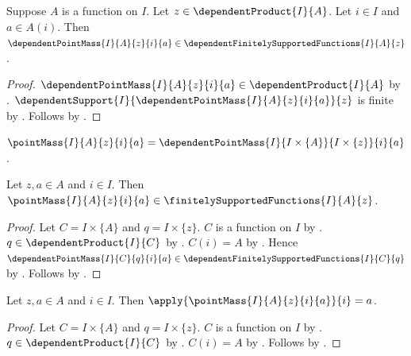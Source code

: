 \begin{proposition}\label{dependent_point_mass_finitely_supported}
    Suppose $A$ is a function on $I$.
    Let $z\in\dependentProduct{I}{A}$.
    Let $i\in I$ and $a\in A(i)$.
    Then
        $\dependentPointMass{I}{A}{z}{i}{a}
            \in\dependentFinitelySupportedFunctions{I}{A}{z}$.
\end{proposition}
\begin{proof}
    $\dependentPointMass{I}{A}{z}{i}{a}
        \in\dependentProduct{I}{A}$ by
        .
    $\dependentSupport{I}{
        \dependentPointMass{I}{A}{z}{i}{a}}{z}$ is finite by
        .
    Follows by
        .
\end{proof}

\begin{definition}\label{point_mass}
    $\pointMass{I}{A}{z}{i}{a}
        =\dependentPointMass
            {I}{I\times\{A\}}{I\times\{z\}}{i}{a}$.
\end{definition}

\begin{proposition}\label{point_mass_finitely_supported}
    Let $z,a\in A$ and $i\in I$.
    Then
        $\pointMass{I}{A}{z}{i}{a}
            \in\finitelySupportedFunctions{I}{A}{z}$.
\end{proposition}
\begin{proof}
    Let $C=I\times\{A\}$ and $q=I\times\{z\}$.
    $C$ is a function on $I$ by
        .
    $q\in\dependentProduct{I}{C}$ by
        .
    $C(i)=A$ by .
    Hence
        $\dependentPointMass{I}{C}{q}{i}{a}
            \in\dependentFinitelySupportedFunctions{I}{C}{q}$ by
        .
    Follows by
        .
\end{proof}

\begin{proposition}\label{point_mass_selected}
    Let $z,a\in A$ and $i\in I$.
    Then $\apply{\pointMass{I}{A}{z}{i}{a}}{i}=a$.
\end{proposition}
\begin{proof}
    Let $C=I\times\{A\}$ and $q=I\times\{z\}$.
    $C$ is a function on $I$ by
        .
    $q\in\dependentProduct{I}{C}$ by
        .
    $C(i)=A$ by .
    Follows by
        .
\end{proof}

